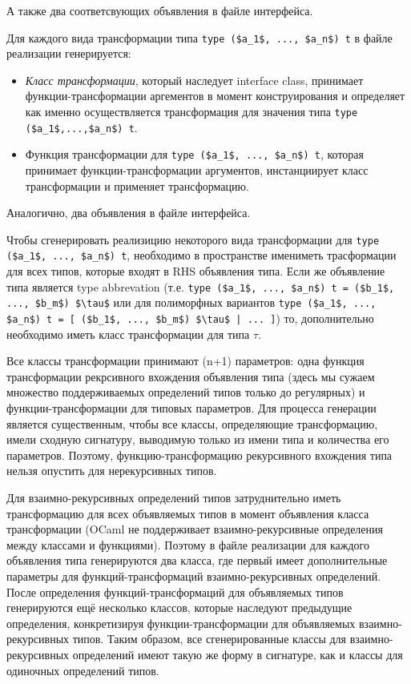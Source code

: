 \documentclass[acmsmall,review,anonymous]{acmart}\settopmatter{printfolios=true,printccs=false,printacmref=false}
\begin{document}
А также два соответсвующих объявления в файле интерфейса.


Для каждого вида трансформации типа \lstinline{type ($a_1$, ..., $a_n$) t} в файле реализации генерируется:
\begin{itemize}
 \item \textit{Класс трансформации}, который наследует interface class, принимает функции-трансформации аргементов в момент конструирования и 
	определяет как именно осуществляется трансформация для значения типа \lstinline{type ($a_1$,...,$a_n$) t}.
 \item Функция трансформации для \lstinline{type ($a_1$, ..., $a_n$) t}, которая принимает функции-трансформации аргументов, инстанциирует
	класс трансформации и применяет трансформацию.
\end{itemize}
Аналогично, два объявления в файле интерфейса.

Чтобы сгенерировать реализицию некоторого вида трансформации для \lstinline{type ($a_1$, ..., $a_n$) t}, необходимо в пространстве имениметь 
трасформации для всех типов, которые входят в RHS объявления типа. Если же объявление типа является type abbrevation (т.е. 
 \lstinline{type ($a_1$, ..., $a_n$) t = ($b_1$, ..., $b_m$) $\tau$} или для полиморфных вариантов 
 \lstinline{type ($a_1$, ..., $a_n$) t = [ ($b_1$, ..., $b_m$) $\tau$ | ... ]}) 
 то, дополнительно необходимо иметь класс трансформации для типа
 $\tau$.

Все классы трансформации принимают (n+1) параметров: одна функция трансформации рекрсивного вхождения объявления типа 
(здесь мы сужаем множество поддерживаемых определений типов только до регулярных) и функции-трансформации для типовых параметров. Для процесса
генерации является существенным, чтобы все классы, определяющие трансформацию, имели сходную сигнатуру, выводимую только из имени типа 
и количества его параметров. Поэтому, функцию-трансформацию рекурсивного вхождения типа нельзя опустить для нерекурсивных типов.

Для взаимно-рекурсивных определений типов затруднительно иметь трансформацию для всех объявляемых типов в момент объявления класса 
трансформации (OCaml не поддерживает взаимно-рекурсивные определения между классами и функциями). Поэтому в файле реализации 
для каждого объявления типа генерируются два класса, где первый имеет дополнительные параметры для функций-трансформаций
взаимно-рекурсивных определений. После определения функций-трансформаций для объявляемых типов генерируются ещё несколько классов,
которые наследуют предыдущие определения, конкретизируя функции-трансформации для объявляемых взаимно-рекурсивных типов. 
Таким образом, все сгенерированные классы для взаимно-рекурсивных определений имеют такую же форму в сигнатуре, как и классы для
одиночных определений типов.
\end{document}
